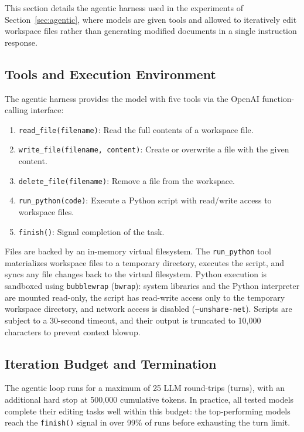 \documentclass{article} %
\begin{document}
This section details the agentic harness used in the experiments of Section~\ref{sec:agentic}, where models are given tools and allowed to iteratively edit workspace files rather than generating modified documents in a single instruction response.

\subsection{Tools and Execution Environment}

The agentic harness provides the model with five tools via the OpenAI function-calling interface:

\begin{enumerate}
    \item \texttt{read\_file(filename)}: Read the full contents of a workspace file.
    \item \texttt{write\_file(filename, content)}: Create or overwrite a file with the given content.
    \item \texttt{delete\_file(filename)}: Remove a file from the workspace.
    \item \texttt{run\_python(code)}: Execute a Python script with read/write access to workspace files.
    \item \texttt{finish()}: Signal completion of the task.
\end{enumerate}

Files are backed by an in-memory virtual filesystem. The \texttt{run\_python} tool materializes workspace files to a temporary directory, executes the script, and syncs any file changes back to the virtual filesystem. Python execution is sandboxed using \texttt{bubblewrap} (\texttt{bwrap}): system libraries and the Python interpreter are mounted read-only, the script has read-write access only to the temporary workspace directory, and network access is disabled (\texttt{--unshare-net}). Scripts are subject to a 30-second timeout, and their output is truncated to 10,000 characters to prevent context blowup.

\subsection{Iteration Budget and Termination}

The agentic loop runs for a maximum of 25 LLM round-trips (turns), with an additional hard stop at 500,000 cumulative tokens. In practice, all tested models complete their editing tasks well within this budget: the top-performing models reach the \texttt{finish()} signal in over 99\% of runs before exhausting the turn limit.
\end{document}
